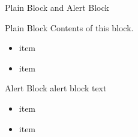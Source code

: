 \documentclass[english]{beamer} %
\begin{document}
\begin{frame}{Plain Block and Alert Block}

\begin{block}{Plain Block}
	Contents of this block.
	\begin{itemize}
		\item item
		\item item
	\end{itemize}
\end{block}

\begin{alertblock}{Alert Block}
	alert block text
	\begin{itemize}
		\item item
		\item item
	\end{itemize}
\end{alertblock}
\end{frame}
\end{document}
